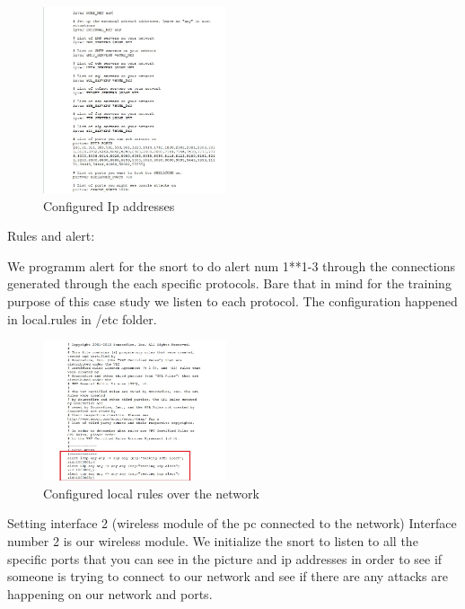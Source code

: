 \documentclass{article}
\begin{document}
\begin{figure}[H]
	\begin{center}
		\includegraphics[width=0.48\textwidth]{Ipconf.jpg}
	\end{center}
	\caption{Configured Ip addresses}
	\label{fig:Ip Addresses configuration}
\end{figure}



Rules and alert:

We programm alert for the snort to do alert num 1**1-3 through the connections generated through the each specific protocols. Bare that in mind for the training purpose of this case study we listen to each protocol. The configuration happened in local.rules in /etc folder.

\begin{figure}[H]
	\begin{center}
		\includegraphics[width=0.48\textwidth]{Localnet.jpg}
	\end{center}
	\caption{Configured local rules over the network}
	\label{fig:Localnet}
\end{figure}







Setting interface 2 (wireless module of the pc connected to the network)
Interface number 2 is our wireless module. We initialize the snort to listen to all the specific ports that you can see in the picture and ip addresses in order to see if someone is trying to connect to our network and see if there are any attacks are happening on our network and ports.
\end{document}
